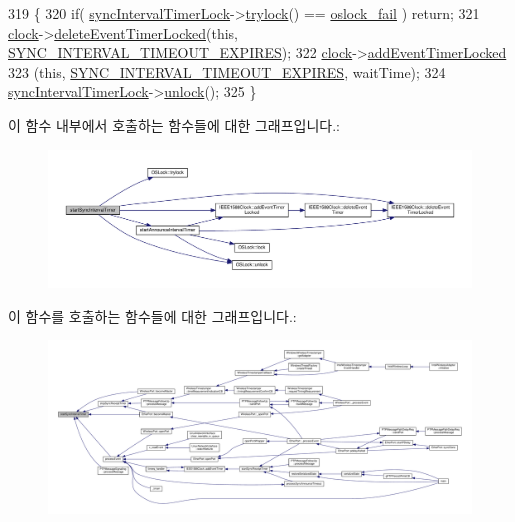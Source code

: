 \begin{DoxyCode}
319 \{
320     \textcolor{keywordflow}{if}( \hyperlink{class_common_port_a2457c760017e253f1202eb8cfef7c00b}{syncIntervalTimerLock}->\hyperlink{class_o_s_lock_ae98ef550f527786080703feace242487}{trylock}() == 
      \hyperlink{avbts__oslock_8hpp_a6ade377184a937ebffbe2a94b7369a64a7d89b4d4b626b10cd99e6179eb7bedc3}{oslock\_fail} ) \textcolor{keywordflow}{return};
321     \hyperlink{class_common_port_aa2bc8731fa5aeb5b033feebc2b67258c}{clock}->\hyperlink{class_i_e_e_e1588_clock_ab3079a65b0509eeb40c2828fa6a7834a}{deleteEventTimerLocked}(\textcolor{keyword}{this}, 
      \hyperlink{ieee1588_8hpp_a5667b805d857c6d28f83f6038a0272d3a3dba953a3ff5fdac319eca872a7fbc87}{SYNC\_INTERVAL\_TIMEOUT\_EXPIRES});
322     \hyperlink{class_common_port_aa2bc8731fa5aeb5b033feebc2b67258c}{clock}->\hyperlink{class_i_e_e_e1588_clock_a4747f09108bd78ecd68d58dad4358d77}{addEventTimerLocked}
323         (\textcolor{keyword}{this}, \hyperlink{ieee1588_8hpp_a5667b805d857c6d28f83f6038a0272d3a3dba953a3ff5fdac319eca872a7fbc87}{SYNC\_INTERVAL\_TIMEOUT\_EXPIRES}, waitTime);
324     \hyperlink{class_common_port_a2457c760017e253f1202eb8cfef7c00b}{syncIntervalTimerLock}->\hyperlink{class_o_s_lock_a5b965df44250112cac3cf967dc998bec}{unlock}();
325 \}
\end{DoxyCode}


이 함수 내부에서 호출하는 함수들에 대한 그래프입니다.\+:
\nopagebreak
\begin{figure}[H]
\begin{center}
\leavevmode
\includegraphics[width=350pt]{class_common_port_a2033d126c19548eb5ada2d623667e1f2_cgraph}
\end{center}
\end{figure}




이 함수를 호출하는 함수들에 대한 그래프입니다.\+:
\nopagebreak
\begin{figure}[H]
\begin{center}
\leavevmode
\includegraphics[width=350pt]{class_common_port_a2033d126c19548eb5ada2d623667e1f2_icgraph}
\end{center}
\end{figure}


